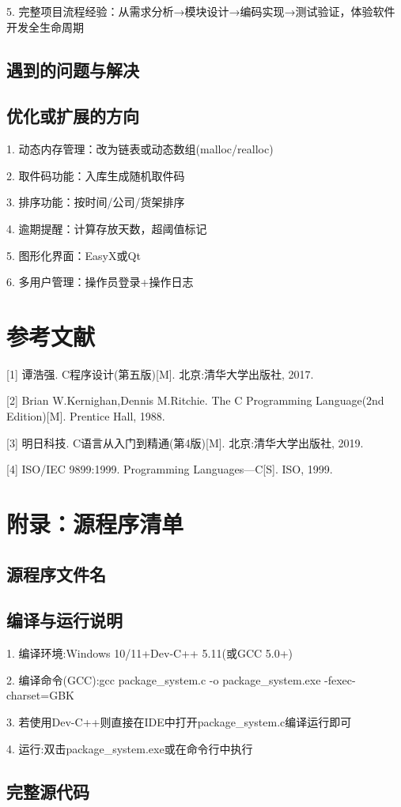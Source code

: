 5. 完整项目流程经验：从需求分析→模块设计→编码实现→测试验证，体验软件开发全生命周期

\subsection{遇到的问题与解决}
\subsection{优化或扩展的方向}
1. 动态内存管理：改为链表或动态数组(malloc/realloc)

2. 取件码功能：入库生成随机取件码

3. 排序功能：按时间/公司/货架排序

4. 逾期提醒：计算存放天数，超阈值标记

5. 图形化界面：EasyX或Qt

6. 多用户管理：操作员登录+操作日志

\section{参考文献}
[1] 谭浩强. C程序设计(第五版)[M]. 北京:清华大学出版社, 2017.

[2] Brian W.Kernighan,Dennis M.Ritchie. The C Programming Language(2nd Edition)[M]. Prentice Hall, 1988.

[3] 明日科技. C语言从入门到精通(第4版)[M]. 北京:清华大学出版社, 2019.

[4] ISO/IEC 9899:1999. Programming Languages—C[S]. ISO, 1999.

\section{附录：源程序清单}
\subsection{源程序文件名}
\subsection{编译与运行说明}
1. 编译环境:Windows 10/11+Dev-C++ 5.11(或GCC 5.0+)

2. 编译命令(GCC):gcc package\_system.c -o package\_system.exe -fexec-charset=GBK

3. 若使用Dev-C++则直接在IDE中打开package\_system.c编译运行即可

4. 运行:双击package\_system.exe或在命令行中执行

\subsection{完整源代码}